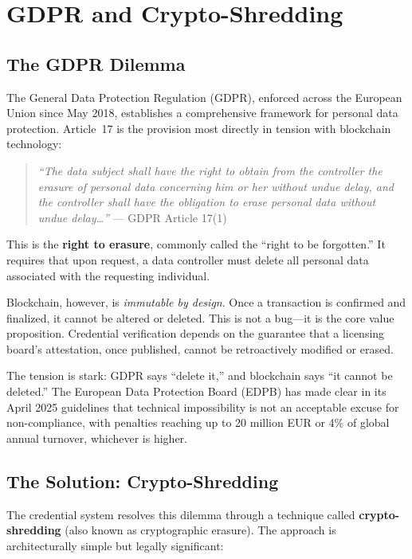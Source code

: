 \section{GDPR and Crypto-Shredding}
\label{sec:gdpr-crypto-shredding}

\subsection{The GDPR Dilemma}

The General Data Protection Regulation (GDPR), enforced across the European
Union since May 2018, establishes a comprehensive framework for personal data
protection.  Article~17 is the provision most directly in tension with
blockchain technology:

\begin{quote}
\textit{``The data subject shall have the right to obtain from the controller
the erasure of personal data concerning him or her without undue delay, and
the controller shall have the obligation to erase personal data without
undue delay\ldots''}  --- GDPR Article 17(1)
\end{quote}

This is the \textbf{right to erasure}, commonly called the ``right to be
forgotten.''  It requires that upon request, a data controller must delete
all personal data associated with the requesting individual.

Blockchain, however, is \emph{immutable by design}.  Once a transaction is
confirmed and finalized, it cannot be altered or deleted.  This is not a
bug---it is the core value proposition.  Credential verification depends on
the guarantee that a licensing board's attestation, once published, cannot
be retroactively modified or erased.

The tension is stark: GDPR says ``delete it,'' and blockchain says ``it
cannot be deleted.''  The European Data Protection Board (EDPB) has made
clear in its April 2025 guidelines that technical impossibility is not an
acceptable excuse for non-compliance, with penalties reaching up to 20
million EUR or 4\% of global annual turnover, whichever is higher.

\subsection{The Solution: Crypto-Shredding}

The credential system resolves this dilemma through a technique called
\textbf{crypto-shredding} (also known as cryptographic erasure).  The
approach is architecturally simple but legally significant:

